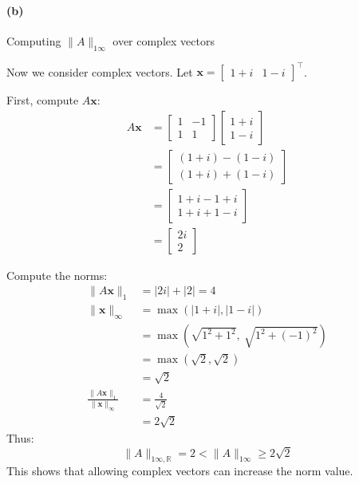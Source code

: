 \paragraph{(b)} Computing $\|A\|_{1\infty}$ over complex vectors

Now we consider complex vectors. Let $\mathbf{x} = \begin{bmatrix} 1 + i & 1 - i \end{bmatrix}^\top$.

First, compute $A\mathbf{x}$:
\begin{align*}
    A\mathbf{x} & = \begin{bmatrix} 1 & -1 \\ 1 & 1 \end{bmatrix} \begin{bmatrix} 1 + i \\ 1 - i \end{bmatrix} \\
                & = \begin{bmatrix} (1 + i) - (1 - i) \\ (1 + i) + (1 - i) \end{bmatrix}                       \\
                & = \begin{bmatrix} 1 + i - 1 + i \\ 1 + i + 1 - i \end{bmatrix}                               \\
                & = \begin{bmatrix} 2i \\ 2 \end{bmatrix}
\end{align*}

Compute the norms:
\begin{align*}
    \|A\mathbf{x}\|_1                               & = |2i| + |2| = 4                                \\
    \|\mathbf{x}\|_{\infty}                         & = \max(|1 + i|, |1 - i|)                        \\
                                                    & = \max(\sqrt{1^2 + 1^2}, \ \sqrt{1^2 + (-1)^2}) \\
                                                    & = \max(\sqrt{2}, \sqrt{2})                      \\
                                                    & = \sqrt{2}                                      \\
    \frac{\|A\mathbf{x}\|_1}{\|\mathbf{x}\|_\infty} & = \frac{4}{\sqrt{2}}                            \\
                                                    & = 2\sqrt{2}
\end{align*}
Thus:
\[
    \|A\|_{1\infty,\mathbb{R}} = 2 < \|A\|_{1\infty} \geq 2\sqrt{2}
\]
This shows that allowing complex vectors can increase the norm value.


